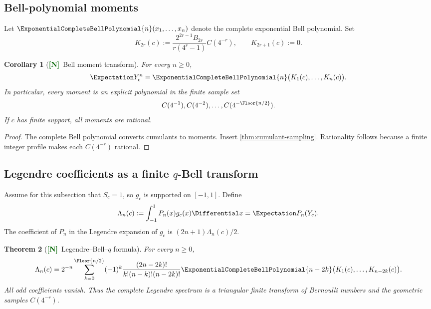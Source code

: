 \documentclass[11pt]{article}
\numberwithin{equation}{section}
\newtheorem{theorem}{Theorem}[section]
\newtheorem{corollary}[theorem]{Corollary}
\theoremstyle{definition}
\theoremstyle{remark}
\newcommand{\New}{\textcolor{darkgreen}{\textsf{\textbf{[N]}}}}
\begin{document}
\subsection{Bell-polynomial moments}

Let $\ExponentialCompleteBellPolynomial{n}(x_1,\ldots,x_n)$ denote the complete exponential Bell polynomial.
Set
\begin{equation}
 K_{2r}(c):=
 \frac{2^{2r-1}B_{2r}}{r(4^r-1)}C(4^{-r}),
 \qquad K_{2r+1}(c):=0.
 \label{eq:K-c}
\end{equation}

\begin{corollary}[\New\ Bell moment transform]
\label{cor:Bell-moments}
For every $n\ge0$,
\begin{equation}
 \Expectation Y_c^n
 =\ExponentialCompleteBellPolynomial{n}\bigl(K_1(c),\ldots,K_n(c)\bigr).
 \label{eq:Bell-profile-moments}
\end{equation}
In particular, every moment is an explicit polynomial in the finite sample set
\[
 C(4^{-1}),C(4^{-2}),\ldots,C(4^{-\Floor{n/2}}).
\]
If $c$ has finite support, all moments are rational.
\end{corollary}

\begin{proof}
The complete Bell polynomial converts cumulants to moments.  Insert
\cref{thm:cumulant-sampling}.  Rationality follows because a finite integer
profile makes each $C(4^{-r})$ rational.
\end{proof}

\subsection{Legendre coefficients as a finite $q$-Bell transform}

Assume for this subsection that $S_c=1$, so $g_c$ is supported on $[-1,1]$.
Define
\begin{equation}
 \Lambda_n(c):=\int_{-1}^{1}P_n(x)g_c(x)\Differential x=\Expectation P_n(Y_c).
 \label{eq:Legendre-observable}
\end{equation}
The coefficient of $P_n$ in the Legendre expansion of $g_c$ is
$(2n+1)\Lambda_n(c)/2$.

\begin{theorem}[\New\ Legendre--Bell--$q$ formula]
\label{thm:Legendre-Bell}
For every $n\ge0$,
\begin{equation}
 \Lambda_n(c)
 =2^{-n}\sum_{k=0}^{\Floor{n/2}}(-1)^k
 \frac{(2n-2k)!}{k!(n-k)!(n-2k)!}
 \ExponentialCompleteBellPolynomial{n-2k}\bigl(K_1(c),\ldots,K_{n-2k}(c)\bigr).
 \label{eq:Legendre-Bell-q}
\end{equation}
All odd coefficients vanish.  Thus the complete Legendre spectrum is a
triangular finite transform of Bernoulli numbers and the geometric samples
$C(4^{-r})$.
\end{theorem}
\end{document}
